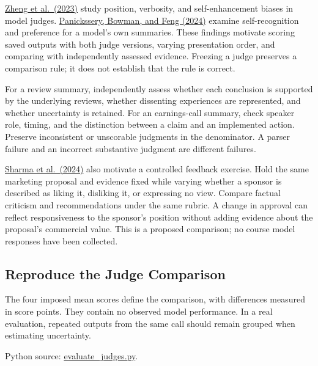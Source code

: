 \href{https://arxiv.org/abs/2306.05685}{Zheng et al.~(2023)} study
position, verbosity, and self-enhancement biases in model judges.
\href{https://arxiv.org/abs/2404.13076}{Panickssery, Bowman, and Feng
(2024)} examine self-recognition and preference for a model's own
summaries. These findings motivate scoring saved outputs with both judge
versions, varying presentation order, and comparing with independently
assessed evidence. Freezing a judge preserves a comparison rule; it does
not establish that the rule is correct.

For a review summary, independently assess whether each conclusion is
supported by the underlying reviews, whether dissenting experiences are
represented, and whether uncertainty is retained. For an earnings-call
summary, check speaker role, timing, and the distinction between a claim
and an implemented action. Preserve inconsistent or unscorable judgments
in the denominator. A parser failure and an incorrect substantive
judgment are different failures.

\href{https://arxiv.org/abs/2310.13548v4}{Sharma et al.~(2024)} also
motivate a controlled feedback exercise. Hold the same marketing
proposal and evidence fixed while varying whether a sponsor is described
as liking it, disliking it, or expressing no view. Compare factual
criticism and recommendations under the same rubric. A change in
approval can reflect responsiveness to the sponsor's position without
adding evidence about the proposal's commercial value. This is a
proposed comparison; no course model responses have been collected.

\hypertarget{M05-reproduce-the-judge-comparison}{%
\subsection{Reproduce the Judge
Comparison}\label{M05-reproduce-the-judge-comparison}}

\noindent \noindent The four imposed mean scores define the comparison, with
differences measured in score points. They contain no observed model
performance. In a real evaluation, repeated outputs from the same call
should remain grouped when estimating uncertainty.

\FloatBarrier
{}
Python source:
\href{../03_Data_and_Code/LLM_Revalidation/evaluate_judges.py}{evaluate\_judges.py}.

